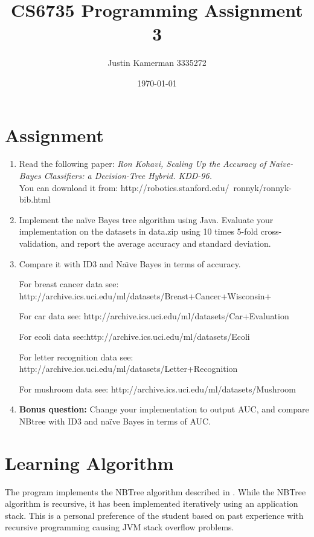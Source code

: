 \documentclass[10pt]{report}
\title{CS6735 Programming Assignment 3}
\author{Justin Kamerman 3335272}
\date{\today}
\begin{document}
\maketitle
\renewcommand*\thesection{\arabic{section}}

\section{Assignment}
\begin{enumerate} 
\item Read the following paper: 
\textit{Ron Kohavi, Scaling Up the Accuracy of Naive-Bayes Classifiers: a
Decision-Tree Hybrid. KDD-96.}
\\
You can download it from: 
http://robotics.stanford.edu/~ronnyk/ronnyk-bib.html
\item Implement the naïve Bayes tree algorithm using Java. Evaluate
your implementation on the datasets in data.zip using 10 times 5-fold
cross-validation, and report the average accuracy and standard
deviation.  
\item Compare it with ID3 and Na\"{\i}ve Bayes in terms of accuracy. 

For breast cancer data see:
http://archive.ics.uci.edu/ml/datasets/Breast+Cancer+Wisconsin+%

For car data see:
http://archive.ics.uci.edu/ml/datasets/Car+Evaluation

For ecoli data see:http://archive.ics.uci.edu/ml/datasets/Ecoli

For letter recognition data see:
http://archive.ics.uci.edu/ml/datasets/Letter+Recognition

For mushroom data see: http://archive.ics.uci.edu/ml/datasets/Mushroom

\item \textbf{Bonus question:} Change your implementation to output AUC, and
  compare NBtree with ID3 and naïve Bayes in terms of AUC. 
\end{enumerate}

\section{Learning Algorithm}
\label{sec:learningalgorithm}
The program implements the NBTree algorithm
described in \cite{RefWorks:63}. While the NBTree algorithm is
recursive, it has been implemented iteratively using an application
stack. This is a personal preference of the student based on past
experience with recursive programming causing JVM stack overflow
problems.
\end{document}
